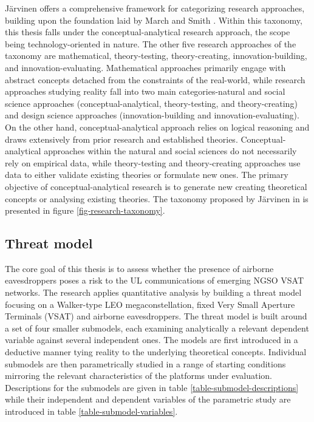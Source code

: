 \documentclass[english, 12pt, a4paper, elec, utf8, a-1b, online]{aaltothesis}
\begin{document}
Järvinen \cite{jarvinen2011tutkimustyon, jarvinen2004research} offers a comprehensive framework for categorizing research approaches, building upon the foundation laid by March and Smith \cite{march1995design}. Within this taxonomy, this thesis falls under the conceptual-analytical research approach, the scope being technology-oriented in nature.
The other five research approaches of the taxonomy are mathematical, theory-testing, theory-creating, innovation-building, and innovation-evaluating.
Mathematical approaches primarily engage with abstract concepts detached from the constraints of the real-world, while research approaches studying reality fall into two main categories-natural and social science approaches (conceptual-analytical, theory-testing, and theory-creating) and design science approaches (innovation-building and innovation-evaluating).
On the other hand, conceptual-analytical approach relies on logical reasoning and draws extensively from prior research and established theories. Conceptual-analytical approaches within the natural and social sciences do not necessarily rely on empirical data, while theory-testing and theory-creating approaches use data to either validate existing theories or formulate new ones. The primary objective of conceptual-analytical research is to generate new creating theoretical concepts or analysing existing theories.
The taxonomy proposed by Järvinen in \cite{jarvinen2011tutkimustyon, jarvinen2004research} is presented in figure \ref{fig-research-taxonomy}.




\subsection{Threat model}

The core goal of this thesis is to assess whether the presence of airborne eavesdroppers poses a risk to the UL communications of emerging NGSO VSAT networks.
The research applies quantitative analysis by building a threat model focusing on a Walker-type LEO megaconstellation, fixed Very Small Aperture Terminals (VSAT) and airborne eavesdroppers.
The threat model is built around a set of four smaller submodels, each examining analytically a relevant dependent variable against several independent ones.
The models are first introduced in a deductive manner tying reality to the underlying theoretical concepts.
Individual submodels are then parametrically studied in a range of starting conditions mirroring the relevant characteristics of the platforms under evaluation.
Descriptions for the submodels are given in table \ref{table-submodel-descriptions} while their independent and dependent variables of the parametric study are introduced in table \ref{table-submodel-variables}.
\end{document}
